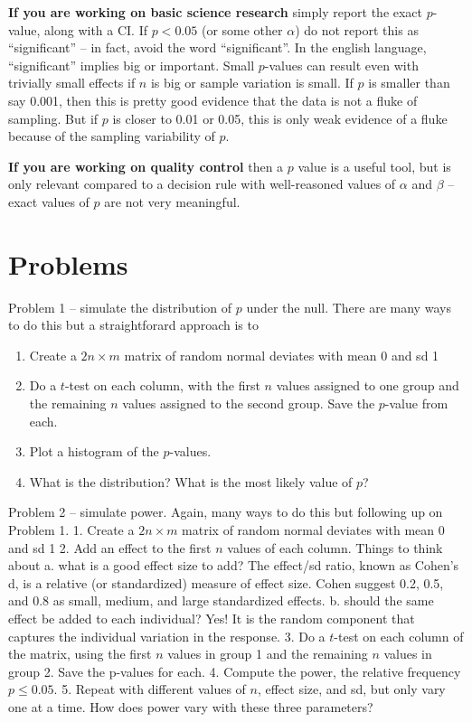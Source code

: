 \documentclass[]{book}
\providecommand{\tightlist}{%
  \setlength{\itemsep}{0pt}\setlength{\parskip}{0pt}}
\theoremstyle{definition}
\theoremstyle{definition}
\theoremstyle{definition}
\theoremstyle{remark}
\begin{document}
\textbf{If you are working on basic science research} simply report the
exact \(p\)-value, along with a CI. If \(p < 0.05\) (or some other
\(\alpha\)) do not report this as ``significant'' -- in fact, avoid the
word ``significant''. In the english language, ``significant'' implies
big or important. Small \(p\)-values can result even with trivially
small effects if \(n\) is big or sample variation is small. If \(p\) is
smaller than say 0.001, then this is pretty good evidence that the data
is not a fluke of sampling. But if \(p\) is closer to 0.01 or 0.05, this
is only weak evidence of a fluke because of the sampling variability of
\(p\).

\textbf{If you are working on quality control} then a \(p\) value is a
useful tool, but is only relevant compared to a decision rule with
well-reasoned values of \(\alpha\) and \(\beta\) -- exact values of
\(p\) are not very meaningful.

\section{Problems}\label{problems-2}

Problem 1 -- simulate the distribution of \(p\) under the null. There
are many ways to do this but a straightforard approach is to

\begin{enumerate}
\def\labelenumi{\arabic{enumi}.}
\tightlist
\item
  Create a \(2n \times m\) matrix of random normal deviates with mean 0
  and sd 1
\item
  Do a \(t\)-test on each column, with the first \(n\) values assigned
  to one group and the remaining \(n\) values assigned to the second
  group. Save the \(p\)-value from each.
\item
  Plot a histogram of the \(p\)-values.
\item
  What is the distribution? What is the most likely value of \(p\)?
\end{enumerate}

Problem 2 -- simulate power. Again, many ways to do this but following
up on Problem 1. 1. Create a \(2n \times m\) matrix of random normal
deviates with mean 0 and sd 1 2. Add an effect to the first \(n\) values
of each column. Things to think about a. what is a good effect size to
add? The effect/sd ratio, known as Cohen's d, is a relative (or
standardized) measure of effect size. Cohen suggest 0.2, 0.5, and 0.8 as
small, medium, and large standardized effects. b. should the same effect
be added to each individual? Yes! It is the random component that
captures the individual variation in the response. 3. Do a \(t\)-test on
each column of the matrix, using the first \(n\) values in group 1 and
the remaining \(n\) values in group 2. Save the p-values for each. 4.
Compute the power, the relative frequency \(p \le 0.05\). 5. Repeat with
different values of \(n\), effect size, and sd, but only vary one at a
time. How does power vary with these three parameters?
\end{document}
